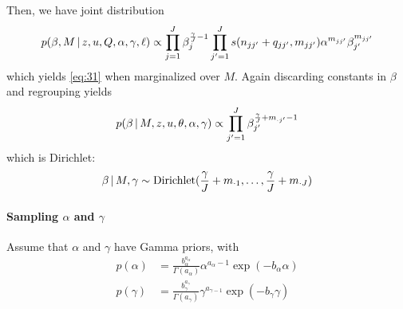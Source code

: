 Then, we have joint distribution
\begin{equation}
  \label{eq:33}
  p(\beta, M \, \vert \, z, u, Q, \alpha, \gamma, \ell) \propto \prod_{j=1}^J
  \beta_j^{\frac{\gamma}{J} - 1} \prod_{j'=1}^{J} s(n_{jj'} + q_{jj'}, m_{jj'}) \alpha^{m_{jj'}} \beta_{j'}^{m_{jj'}}
\end{equation}
which yields \eqref{eq:31} when marginalized over $M$.  Again discarding
constants in $\beta$ and regrouping yields
\begin{equation}
  \label{eq:34}
  p(\beta \, \vert \, M, z, u, \theta, \alpha, \gamma) \propto \prod_{{j'}=1}^J
  \beta_{j'}^{\frac{\gamma}{J} + m_{\cdot {j'}}- 1}
\end{equation}
which is Dirichlet:
\begin{equation}
  \label{eq:38}
  \beta \, \vert \, M, \gamma \sim \mathrm{Dirichlet}(\frac{\gamma}{J} +
  m_{\cdot 1}, \dots, \frac{\gamma}{J} + m_{\cdot J})
\end{equation}

\paragraph{Sampling $\alpha$ and $\gamma$}
\label{sec:sampling-alpha}
Assume that $\alpha$ and $\gamma$ have Gamma priors, with
\begin{align}
  \label{eq:42}
  p(\alpha) &= \frac{b_{\alpha}^{a_{\alpha}}}{\Gamma(a_{\alpha})}
  \alpha^{a_{\alpha} - 1} \exp(-b_{\alpha}\alpha) \\
  p(\gamma) &= \frac{b_{\gamma}^{a_\gamma}}{\Gamma(a_{\gamma})}
  \gamma^{a_{\gamma - 1}} \exp(-b_{\gamma}\gamma)
\end{align}


